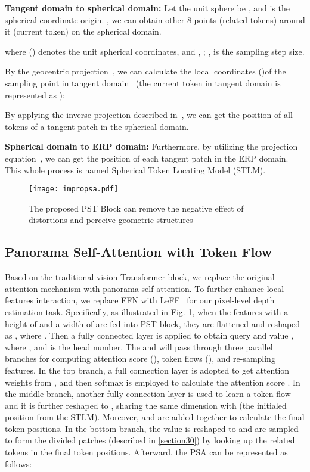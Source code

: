 \documentclass[runningheads]{llncs}
\begin{document}
\noindent \textbf{Tangent domain to spherical domain:} Let the unit sphere be , and  is the spherical coordinate origin. , we can obtain other 8 points (related tokens) around it (current token) on the spherical domain.


where () denotes the unit spherical coordinates, and , ; , is the sampling step size.

 By the geocentric projection~\cite{pearson1990map}, we can calculate the local coordinates ()of the sampling point in tangent domain~\cite{coors2018spherenet} (the current token in tangent domain is represented as ):
 
By applying the inverse projection described in~\cite{coors2018spherenet}, we can get the position of all tokens of a tangent patch in the spherical domain.

\noindent \textbf{Spherical domain to ERP domain:} Furthermore, by utilizing the projection equation~\cite{shen2021distortion}, we can get the position of each tangent patch in the ERP domain. This whole process is named Spherical Token Locating Model (STLM).

\begin{figure}[t]
  \centering
  \texttt{[image: impropsa.pdf]} \caption{The proposed PST Block can remove the negative effect of distortions and perceive geometric structures} \label{fig:block}
\end{figure}
\subsection{Panorama Self-Attention with Token Flow}
\label{section33}
Based on the traditional vision Transformer block, we replace the original attention mechanism with panorama self-attention. To further enhance local features interaction, we replace FFN with LeFF~\cite{yuan2021incorporating} for our pixel-level depth estimation task.
Specifically, as illustrated in Fig. \ref{fig:block}, when the features  with a height of  and a width of  are fed into PST block, they are flattened and reshaped as , where . Then a  fully connected layer is applied to obtain query  and value , where , and  is the head number. The  and  will pass through three parallel branches for computing attention score (), token flows (), and re-sampling features. In the top branch, a full connection layer is adopted to get attention weights  from , and then softmax is employed to calculate the attention score . In the middle branch, another fully connection layer is used to learn a token flow  and it is further reshaped to , sharing the same dimension with  (the initialed position from the STLM). Moreover,  and  are added together to calculate the final token positions. In the bottom branch, the value  is reshaped to  and are sampled to form the divided patches (described in \ref{section30}) by looking up the related tokens in the final token positions. Afterward, the PSA can be represented as follows:
\end{document}
